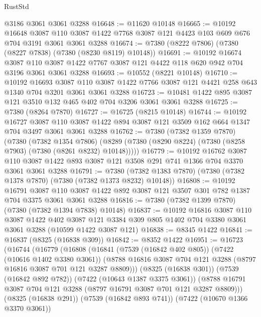 \begin{lexlean}{RustStd}
\begin{coremodule}
    @3186
    @3061
    @3061
    @3288
@16648 := @11620 @10148
@16665 := @10192
    @16648
    @3087
    @110
    @3087
    @1422
    @7768
    @3087
    @121
    @4423
    @103
    @609
    @676
    @704
    @3191
    @3061
    @3061
    @3288
@16674 := @7380 (@8222 @7806) (@7380 (@8227 @7838) (@7380 (@8230 @8119) @10148))
@16691 := @10192
    @16674
    @3087
    @110
    @3087
    @1422
    @7767
    @3087
    @121
    @4422
    @118
    @620
    @942
    @704
    @3196
    @3061
    @3061
    @3288
@16693 := @10552 (@8221 @10148)
@16710 := @10192
    @16693
    @3087
    @110
    @3087
    @1422
    @7766
    @3087
    @121
    @4421
    @258
    @643
    @1340
    @704
    @3201
    @3061
    @3061
    @3288
@16723 := @10481 @1422 @895 @3087 @121 @3510 @132 @465 @402 @704 @3206 @3061 @3061 @3288
@16725 := @7380 (@8264 @7870)
@16727 := @16725 (@8215 @10148)
@16744 := @10192
    @16727
    @3087
    @110
    @3087
    @1422
    @894
    @3087
    @121
    @3509
    @162
    @664
    @1347
    @704
    @3497
    @3061
    @3061
    @3288
@16762 := @7380
    (@7382 @1359 @7870)
    (@7380
      (@7382 @1354 @7806)
      (@8289 (@7380 (@8290 @8224) (@7380 (@8258 @7903) (@7380 (@8261 @8232) @10148)))))
@16779 := @10192
    @16762
    @3087
    @110
    @3087
    @1422
    @893
    @3087
    @121
    @3508
    @291
    @741
    @1366
    @704
    @3370
    @3061
    @3061
    @3288
@16791 := @7380 (@7382 @1383 @7870) (@7380 (@7382 @1378 @7870) (@7380 (@7382 @1373 @8232) @10148))
@16808 := @10192
    @16791
    @3087
    @110
    @3087
    @1422
    @892
    @3087
    @121
    @3507
    @301
    @782
    @1387
    @704
    @3375
    @3061
    @3061
    @3288
@16816 := @7380 (@7382 @1399 @7870) (@7380 (@7382 @1394 @7838) @10148)
@16837 := @10192
    @16816
    @3087
    @110
    @3087
    @1422
    @402
    @3087
    @121
    @3384
    @309
    @805
    @1402
    @704
    @3380
    @3061
    @3061
    @3288
    (@10599 @1422 @3087 @121)
@16838 := @8345 @1422
@16841 := @16837 (@8325 (@16838 @309))
@16842 := @8352 @1422
@16951 := @16723
    (@16744
      (@16779
        (@16808
          (@16841
            (@7539 (@16842 @402 @805))
            (@7422 (@10616 @1402 @3380 @3061))
            (@8788 @16816 @3087 @704 @121 @3288 (@8797 @16816 @3087 @701 @121 @3287 @8809)))
          (@8325 (@16838 @301))
          (@7539 (@16842 @892 @782))
          (@7422 (@10643 @1387 @3375 @3061))
          (@8788 @16791 @3087 @704 @121 @3288 (@8797 @16791 @3087 @701 @121 @3287 @8809)))
        (@8325 (@16838 @291))
        (@7539 (@16842 @893 @741))
        (@7422 (@10670 @1366 @3370 @3061))

\end{coremodule}
\end{lexlean}
